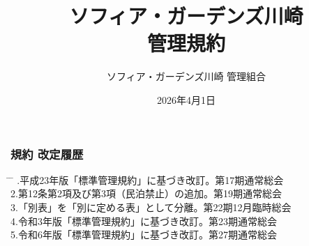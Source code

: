 \documentclass[
  twoside,
  luatex,
  paper=a4paper,
  fontsize=11pt,
  jafontsize=11pt,
  jlreq_notes,
]{jlreq}
\renewcommand{\baselinestretch}{0.9}
\begin{document}
  \pagestyle{empty} %
  \title{ソフィア・ガーデンズ川崎\\管理規約}
  \date{2026年4月1日}
  \maketitle
  \thispagestyle{empty}
  \vfill      %

  \begin{center}
    \vspace*{3\baselineskip}
    \author{\Large ソフィア・ガーデンズ川崎 管理組合}
  \end{center}
  \vspace*{2\baselineskip}
  { \renewcommand{\baselinestretch}{0.8}\selectfont   %
    \subsubsection*{ 規約 改定履歴 }
    \small
    \vspace*{1\baselineskip}
    \begin{tabbing}
      \hspace{5mm} \= \hspace{90mm} \= \hspace{100mm} .\>平成23年版「標準管理規約」に基づき改訂。\>第17期通常総会\\
      2.\>第12条第2項及び第3項（民泊禁止）の追加。\>第19期通常総会\\
      3.\>「別表」を「別に定める表」として分離。\>第22期12月臨時総会\\
      4.\>令和3年版「標準管理規約」に基づき改訂。\>第23期通常総会\\
      5.\>令和6年版「標準管理規約」に基づき改訂。\>第27期通常総会\\
    \end{tabbing}
  }
  \clearpage

  { \renewcommand{\baselinestretch}{0.8}\selectfont
    \tableofcontents        %
  }
  \cleardoublepage 

  \setcounter{page}{1}    %
  \pagestyle{plain}       %
\end{document}
